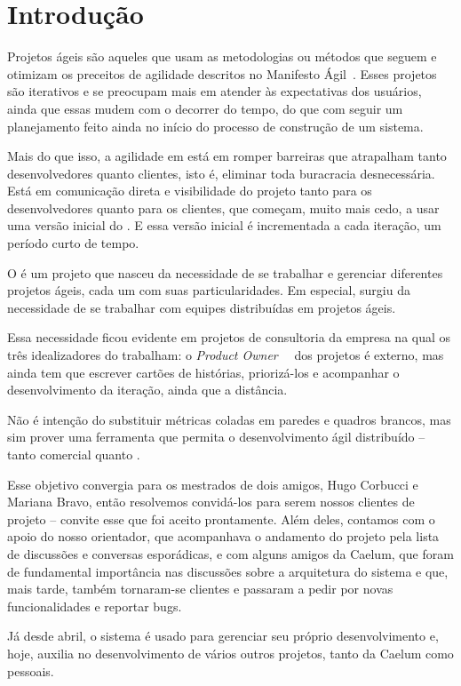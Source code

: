 \section{Introdução}
Projetos ágeis são aqueles que usam as metodologias ou métodos que seguem e otimizam os preceitos de agilidade descritos no Manifesto Ágil~\cite{manifesto}. Esses projetos são iterativos e se preocupam mais em atender às expectativas dos usuários, ainda que essas mudem com o decorrer do tempo, do que com seguir um planejamento feito ainda no início do processo de construção de um sistema.

Mais do que isso, a agilidade em está em romper barreiras que atrapalham tanto desenvolvedores quanto clientes, isto é, eliminar toda buracracia desnecessária. Está em comunicação direta e visibilidade do projeto tanto para os desenvolvedores quanto para os clientes, que começam, muito mais cedo, a usar uma versão inicial do \software{}. E essa versão inicial é incrementada a cada iteração, um período curto de tempo. 

O \calopsita{} é um projeto que nasceu da necessidade de se trabalhar e gerenciar diferentes projetos ágeis, cada um com suas particularidades. Em especial, surgiu da necessidade de se trabalhar com equipes distribuídas em projetos ágeis. 

Essa necessidade ficou evidente em projetos de consultoria da empresa na qual os três idealizadores do \calopsita{} trabalham: o \textit{Product Owner}~\cite{po}~\cite{scrum}
dos projetos é externo, mas ainda tem que escrever cartões de histórias, priorizá-los e acompanhar o desenvolvimento da iteração, ainda que a distância.

Não é intenção do \calopsita{} substituir métricas coladas em paredes e quadros brancos, mas sim prover uma ferramenta que permita o desenvolvimento ágil distribuído -- tanto comercial quanto \opensource{}.  

Esse objetivo convergia para os mestrados de dois amigos, Hugo Corbucci e Mariana Bravo, então resolvemos convidá-los para serem nossos clientes de projeto -- convite esse que foi aceito prontamente. Além deles, contamos com o apoio do nosso orientador, que acompanhava o andamento do projeto pela lista de discussões e conversas esporádicas, e com alguns amigos da Caelum, que foram de fundamental importância nas discussões sobre a arquitetura do sistema e que, mais tarde, também tornaram-se clientes e passaram a pedir por novas funcionalidades e reportar bugs. 

Já desde abril, o sistema é usado para gerenciar seu próprio desenvolvimento e, hoje, auxilia no desenvolvimento de vários outros projetos, tanto da Caelum como pessoais.

